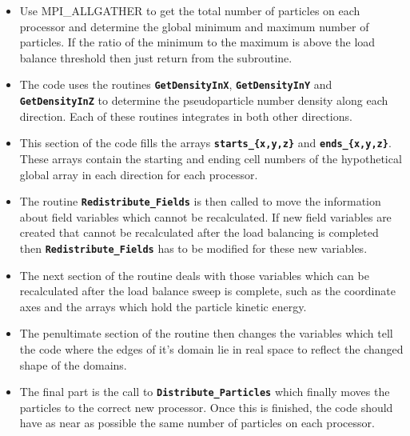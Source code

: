 \documentclass[12pt]{article}
\newcommand{\inlinecode}[1]{{\color{warwickred} \bf\texttt{#1}}}
\begin{document}
\begin{itemize}
\item Use MPI\_ALLGATHER to get the total number of particles on each processor
  and determine the global minimum and maximum number of particles. If the
  ratio of the minimum to the maximum is above the load balance threshold then
  just return from the subroutine.
\item The code uses the routines \inlinecode{GetDensityInX},
  \inlinecode{GetDensityInY} and \inlinecode{GetDensityInZ} to determine the
  pseudoparticle number density along each direction. Each of these routines
  integrates in both other directions.
\item This section of the code fills the arrays \inlinecode{starts\_\{x,y,z\}}
  and \inlinecode{ends\_\{x,y,z\}}. These arrays contain the starting and
  ending cell numbers of the hypothetical global array in each direction for
  each processor.
\item The routine \inlinecode{Redistribute\_Fields} is then called to move the
  information about field variables which cannot be recalculated. If new field
  variables are created that cannot be recalculated after the load balancing is
  completed then \inlinecode{Redistribute\_Fields} has to be modified for these
  new variables.
\item The next section of the routine deals with those variables which can be
  recalculated after the load balance sweep is complete, such as the coordinate
  axes and the arrays which hold the particle kinetic energy.
\item The penultimate section of the routine then changes the variables which
  tell the code where the edges of it's domain lie in real space to reflect the
  changed shape of the domains.
\item The final part is the call to \inlinecode{Distribute\_Particles} which
  finally moves the particles to the correct new processor. Once this is
  finished, the code should have as near as possible the same number of
  particles on each processor.
\end{itemize}
\end{document}
